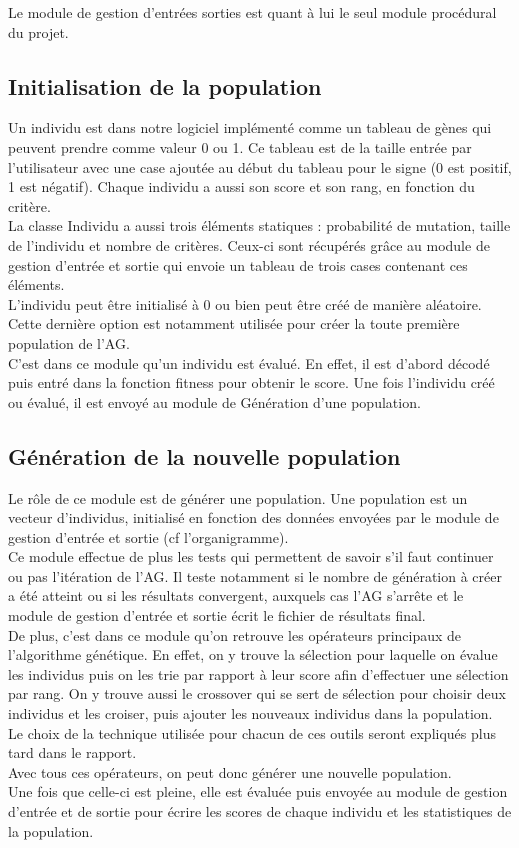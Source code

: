 \documentclass[a4paper,11pt]{article}
\begin{document}
		Le module de gestion d’entrées sorties est quant à lui le seul module procédural du projet.
		
		\subsection{Initialisation de la population}
			Un individu est dans notre logiciel implémenté comme un tableau de gènes qui peuvent prendre comme valeur 0 ou 1.
			Ce tableau est de la taille entrée par l’utilisateur avec une case ajoutée au début du tableau pour le signe (0 est positif, 1 est négatif).
			Chaque individu a aussi son score et son rang, en fonction du critère.\\
			La classe Individu a aussi trois éléments statiques : probabilité de mutation, taille de l’individu et nombre de critères.
			Ceux-ci sont récupérés grâce au module de gestion d’entrée et sortie qui envoie un tableau de trois cases contenant ces éléments.\\
			L’individu peut être initialisé à 0 ou bien peut être créé de manière aléatoire. Cette dernière option est notamment utilisée pour créer la toute première population de l’AG.\\
			C’est dans ce module qu’un individu est évalué.
			En effet, il est d’abord décodé puis entré dans la fonction fitness pour obtenir le score.
			Une fois l’individu créé ou évalué, il est envoyé au module de Génération d’une population.
		
		\subsection{Génération de la nouvelle population}
		
			Le rôle de ce module est de générer une population.
			Une population est un vecteur d’individus, initialisé en fonction des données envoyées par le module de gestion d’entrée et sortie (cf l’organigramme).\\
			Ce module effectue de plus les tests qui permettent de savoir s’il faut continuer ou pas l’itération de l’AG.
			Il teste notamment si le nombre de génération à créer a été atteint ou si les résultats convergent, auxquels cas l’AG s’arrête et le module de gestion d’entrée et sortie écrit le fichier de résultats final.\\
			De plus, c’est dans ce module qu’on retrouve les opérateurs principaux de l’algorithme génétique.
			En effet, on y trouve la sélection pour laquelle on évalue les individus puis on les trie par rapport à leur score afin d’effectuer une sélection par rang.
			On y trouve aussi le crossover qui se sert de sélection pour choisir deux individus et les croiser, puis ajouter les nouveaux individus dans la population.
			Le choix de la technique utilisée pour chacun de ces outils seront expliqués plus tard dans le rapport.\\
			Avec tous ces opérateurs, on peut donc générer une nouvelle population.\\
			Une fois que celle-ci est pleine, elle est évaluée puis envoyée au module de gestion d’entrée et de sortie pour écrire les scores de chaque individu et les statistiques de la population.\\
\end{document}
